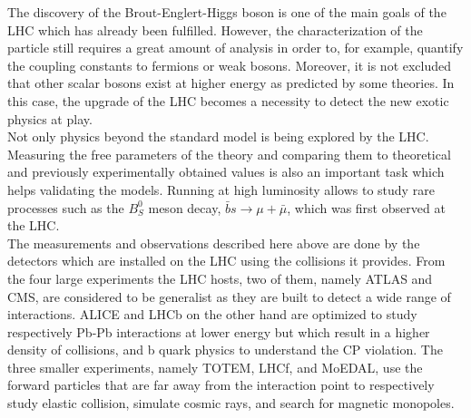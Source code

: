     The discovery of the Brout-Englert-Higgs boson is one of the main goals of the LHC which has already been fulfilled. However, the characterization of the particle still requires a great amount of analysis in order to, for example, quantify the coupling constants to fermions or weak bosons. Moreover, it is not excluded that other scalar bosons exist at higher energy as predicted by some theories. In this case, the upgrade of the LHC becomes a necessity to detect the new exotic physics at play. \\

    Not only physics beyond the standard model is being explored by the LHC. Measuring the free parameters of the theory and comparing them to theoretical and previously experimentally obtained values is also an important task which helps validating the models. Running at high luminosity allows to study rare processes such as the $ B^0_S $ meson decay, $ \bar{b}s \rightarrow \mu + \bar{\mu} $, which was first observed at the LHC. \\

    The measurements and observations described here above are done by the detectors which are installed on the LHC using the collisions it provides. From the four large experiments the LHC hosts, two of them, namely ATLAS and CMS, are considered to be generalist as they are built to detect a wide range of interactions. ALICE and LHCb on the other hand are optimized to study respectively Pb-Pb interactions at lower energy but which result in a higher density of collisions, and b quark physics to understand the CP violation. The three smaller experiments, namely TOTEM, LHCf, and MoEDAL, use the forward particles that are far away from the interaction point to respectively study elastic collision, simulate cosmic rays, and search for magnetic monopoles.
